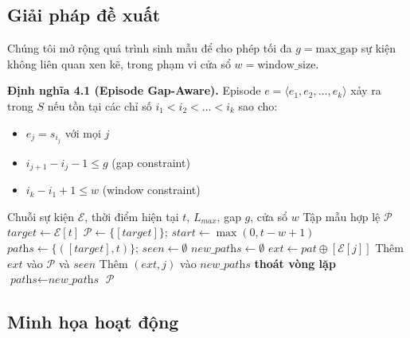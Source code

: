 \documentclass[a4paper,12pt]{report}
\begin{document}
\subsection{Giải pháp đề xuất}
Chúng tôi mở rộng quá trình sinh mẫu để cho phép tối đa $g = \text{max\_gap}$ sự kiện không liên quan xen kẽ, trong phạm vi cửa sổ $w = \text{window\_size}$.

\textbf{Định nghĩa 4.1 (Episode Gap-Aware).} Episode $e = \langle e_1, e_2, \dots, e_k \rangle$ xảy ra trong $S$ nếu tồn tại các chỉ số $i_1 < i_2 < \dots < i_k$ sao cho:
\begin{itemize}
    \item $e_j = s_{i_j}$ với mọi $j$
    \item $i_{j+1} - i_j - 1 \leq g$ (gap constraint)
    \item $i_k - i_1 + 1 \leq w$ (window constraint)
\end{itemize}

\begin{algorithm}[H]
\caption{Sinh mẫu Gap-Aware Episode}
\label{alg:gap}
\begin{algorithmic}[1]
\REQUIRE Chuỗi sự kiện $\mathcal{E}$, thời điểm hiện tại $t$, $L_{max}$, gap $g$, cửa sổ $w$
\ENSURE Tập mẫu hợp lệ $\mathcal{P}$
\STATE $\textit{target} \leftarrow \mathcal{E}[t]$
\STATE $\mathcal{P} \leftarrow \{[\textit{target}]\}$; $\textit{start} \leftarrow \max(0, t - w + 1)$
\STATE $\textit{paths} \leftarrow \{([\textit{target}], t)\}$; $\textit{seen} \leftarrow \emptyset$
    \STATE $\textit{new\_paths} \leftarrow \emptyset$
            \STATE $\textit{ext} \leftarrow \textit{pat} \oplus [\mathcal{E}[j]]$ 
                \STATE Thêm $\textit{ext}$ vào $\mathcal{P}$ và $\textit{seen}$
                \STATE Thêm $(\textit{ext}, j)$ vào $\textit{new\_paths}$
            \ENDIF
                \STATE \textbf{thoát vòng lặp} 
            \ENDIF
        \ENDFOR
    \ENDFOR
    \STATE $\textit{paths} \leftarrow \textit{new\_paths}$
\ENDFOR
\RETURN $\mathcal{P}$
\end{algorithmic}
\end{algorithm}

\subsection{Minh họa hoạt động}
\end{document}
